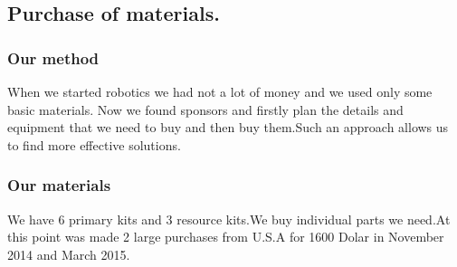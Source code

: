 	\subsection{Purchase of materials.}
		\subsubsection{Our method}
		When we started robotics we had not a lot of money and we used only some basic materials. Now we found sponsors and firstly plan the details and equipment that we need to buy and then buy them.Such an approach allows us to find more effective solutions.
		\subsubsection{Our materials}
		We have 6 primary kits and 3 resource kits.We buy individual parts we need.At this point was made 2 large purchases from U.S.A for 1600 Dolar in November 2014 and March 2015.
\newpage	